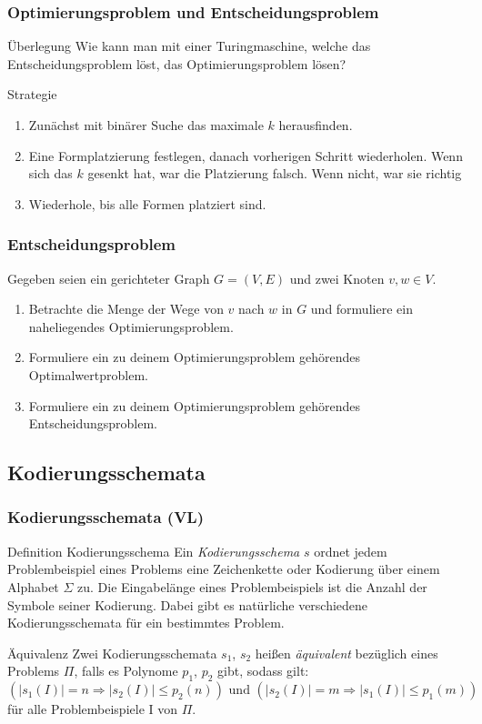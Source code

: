 \begin{frame}
 \frametitle{Optimierungsproblem und Entscheidungsproblem}
 \begin{block}{Überlegung}
  Wie kann man mit einer Turingmaschine, welche das Entscheidungsproblem löst, das Optimierungsproblem lösen?
 \end{block}
\begin{block}{Strategie}
 \begin{enumerate}
  \item Zunächst mit binärer Suche das maximale $k$ herausfinden.
  \item Eine Formplatzierung festlegen, danach vorherigen Schritt wiederholen. Wenn sich das $k$ gesenkt hat, war die Platzierung falsch. 
  Wenn nicht, war sie richtig
  \item Wiederhole, bis alle Formen platziert sind.
 \end{enumerate}
\end{block}
\end{frame}



\begin{frame}
 \frametitle{Entscheidungsproblem}
  Gegeben seien ein gerichteter Graph $G = (V, E)$ und zwei Knoten $v, w \in V$.
  
  \begin{enumerate}
  	\item Betrachte die Menge der Wege von $v$ nach $w$ in $G$ und formuliere ein naheliegendes Optimierungsproblem.
  	\item Formuliere ein zu deinem Optimierungsproblem gehörendes Optimalwertproblem.
  	\item Formuliere ein zu deinem Optimierungsproblem gehörendes Entscheidungsproblem.
  \end{enumerate}
\end{frame}

\subsection{Kodierungsschemata}
\begin{frame}
 \frametitle{Kodierungsschemata (VL)}
 \begin{block}{Definition Kodierungsschema}
 Ein \emph{Kodierungsschema} $s$ ordnet jedem Problembeispiel eines Problems eine Zeichenkette oder Kodierung über einem Alphabet $\Sigma$ zu. 
 Die Eingabelänge eines Problembeispiels ist die Anzahl der Symbole seiner Kodierung.
 Dabei gibt es natürliche verschiedene Kodierungsschemata für ein bestimmtes Problem.
 \end{block}
 \begin{block}{Äquivalenz}
  Zwei Kodierungsschemata $s_1$, $s_2$ heißen \emph{äquivalent} bezüglich eines Problems $\Pi$, falls es Polynome $p_1$, $p_2$ gibt, sodass gilt:
  \[
   (|s_1(I)| = n \Rightarrow |s_2(I)| \leq p_2(n))\mbox{ und } (|s_2(I)| = m \Rightarrow |s_1(I)| \leq p_1(m))
  \]
für alle Problembeispiele I von $\Pi$.
 \end{block}
\end{frame}

